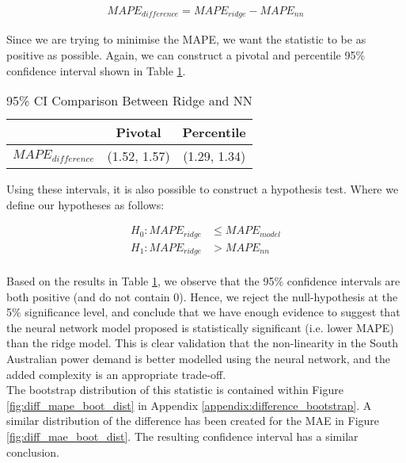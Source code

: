 \documentclass[11pt]{article}
\begin{document}
\begin{align*}
MAPE_{difference} = MAPE_{ridge} - MAPE_{nn}
\end{align*}

\noindent Since we are trying to minimise the MAPE, we want the statistic to be as positive as possible. Again, we can construct a pivotal and percentile 95\% confidence interval shown in Table \ref{table:CI_ridge_nn}.

\begin{table}[H]
\centering
\caption{95\% CI Comparison Between Ridge and NN}
\label{table:CI_ridge_nn}
\begin{tabular}{ccc}
\hline
 & \textbf{Pivotal} & \textbf{Percentile}\\ \hline
$MAPE_{difference}$ & (1.52, 1.57) & (1.29, 1.34) \\ \hline
\end{tabular}
\end{table}

\noindent Using these intervals, it is also possible to construct a hypothesis test. Where we define our hypotheses as follows:


\begin{align*}
H_0: MAPE_{ridge} &\leq  MAPE_{model}  \\
H_1: MAPE_{ridge} &> MAPE_{nn} 
\end{align*}
\\
\noindent Based on the results in Table \ref{table:CI_ridge_nn}, we observe that the 95\% confidence intervals are both positive (and do not contain 0). Hence, we reject the null-hypothesis at the 5\% significance level, and conclude that we have enough evidence to suggest that the neural network model proposed is statistically significant (i.e. lower MAPE) than the ridge model. This is clear validation that the non-linearity in the South Australian power demand is better modelled using the neural network, and the added complexity is an appropriate trade-off.
\\

\noindent The bootstrap distribution of this statistic is contained within Figure \ref{fig:diff_mape_boot_dist} in Appendix \ref{appendix:difference_bootstrap}. A similar distribution of the difference has been created for the MAE in Figure \ref{fig:diff_mae_boot_dist}. The resulting confidence interval has a similar conclusion. 
\end{document}
